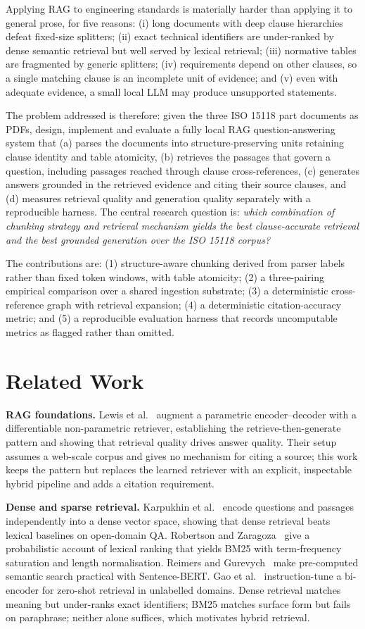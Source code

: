 \documentclass[conference]{IEEEtran}
\begin{document}
Applying RAG to engineering standards is materially harder than applying it to general prose, for five reasons: (i) long documents with deep clause hierarchies defeat fixed-size splitters; (ii) exact technical identifiers are under-ranked by dense semantic retrieval but well served by lexical retrieval; (iii) normative tables are fragmented by generic splitters; (iv) requirements depend on other clauses, so a single matching clause is an incomplete unit of evidence; and (v) even with adequate evidence, a small local LLM may produce unsupported statements.

The problem addressed is therefore: given the three ISO 15118 part documents as PDFs, design, implement and evaluate a fully local RAG question-answering system that (a) parses the documents into structure-preserving units retaining clause identity and table atomicity, (b) retrieves the passages that govern a question, including passages reached through clause cross-references, (c) generates answers grounded in the retrieved evidence and citing their source clauses, and (d) measures retrieval quality and generation quality separately with a reproducible harness. The central research question is: \emph{which combination of chunking strategy and retrieval mechanism yields the best clause-accurate retrieval and the best grounded generation over the ISO 15118 corpus?}

The contributions are: (1) structure-aware chunking derived from parser labels rather than fixed token windows, with table atomicity; (2) a three-pairing empirical comparison over a shared ingestion substrate; (3) a deterministic cross-reference graph with retrieval expansion; (4) a deterministic citation-accuracy metric; and (5) a reproducible evaluation harness that records uncomputable metrics as flagged rather than omitted.

\section{Related Work}
\textbf{RAG foundations.} Lewis et al.~\cite{lewis2020} augment a parametric encoder--decoder with a differentiable non-parametric retriever, establishing the retrieve-then-generate pattern and showing that retrieval quality drives answer quality. Their setup assumes a web-scale corpus and gives no mechanism for citing a source; this work keeps the pattern but replaces the learned retriever with an explicit, inspectable hybrid pipeline and adds a citation requirement.

\textbf{Dense and sparse retrieval.} Karpukhin et al.~\cite{karpukhin2020} encode questions and passages independently into a dense vector space, showing that dense retrieval beats lexical baselines on open-domain QA. Robertson and Zaragoza~\cite{robertson2009} give a probabilistic account of lexical ranking that yields BM25 with term-frequency saturation and length normalisation. Reimers and Gurevych~\cite{reimers2019} make pre-computed semantic search practical with Sentence-BERT. Gao et al.~\cite{gao2023} instruction-tune a bi-encoder for zero-shot retrieval in unlabelled domains. Dense retrieval matches meaning but under-ranks exact identifiers; BM25 matches surface form but fails on paraphrase; neither alone suffices, which motivates hybrid retrieval.
\end{document}
